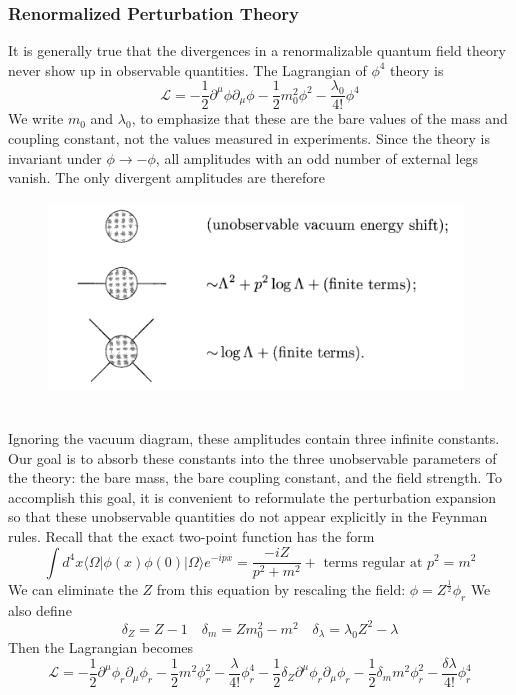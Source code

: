 \documentclass{article}
\begin{document}
\subsubsection{Renormalized Perturbation Theory}
It is generally true that the divergences in a renormalizable quantum field theory never show up in observable quantities. 
The Lagrangian of $\phi^4$ theory is 
\[\mathcal{L} = -\frac{1}{2} \partial^{\mu} \phi \partial_{\mu} \phi -\frac{1}{2}m_0^2 \phi^2 - \frac{\lambda_0}{4!}\phi^4\]
We write $m_0$ and $\lambda_0$, to emphasize that these are the bare values of the mass and coupling constant, not the values measured in experiments.
Since the theory is invariant under $\phi \to -\phi$, all amplitudes with an odd number of external legs vanish. The only divergent amplitudes are therefore
\begin{figure}[!h]
\centering
\includegraphics[height=5cm ,width=11cm]{./pic/RG1.png}
\caption*{}
\end{figure}\\
Ignoring the vacuum diagram, these amplitudes contain three infinite constants. Our goal is to absorb these constants into the three unobservable parameters of the theory: the bare mass, the bare coupling constant, and the field strength. To accomplish this goal, it is convenient to reformulate the perturbation expansion so that these unobservable quantities do not appear
explicitly in the Feynman rules. Recall that the exact two-point function has the form
\[\int d^4x \langle \Omega | \phi(x) \phi(0) | \Omega \rangle e^{-ipx} = \frac{-iZ}{p^2+m^2} + \mbox{ terms regular at } p^2 = m^2\]
We can eliminate the $Z$ from this equation by rescaling the field:
$\phi = Z^{\frac{1}{2}} \phi_r$
We also define
\[\delta_Z = Z -1 \quad \delta_m = Zm_0^2 - m^2 \quad \delta_{\lambda} = \lambda_0 Z^2 - \lambda\]
Then the Lagrangian becomes
\[\mathcal{L} = -\frac{1}{2} \partial^{\mu} \phi_r \partial_{\mu} \phi_r -\frac{1}{2}m^2 \phi_r^2 - \frac{\lambda}{4!}\phi_r^4 -\frac{1}{2} \delta_Z \partial^{\mu} \phi_r \partial_{\mu} \phi_r -\frac{1}{2}\delta_m m^2 \phi_r^2 - \frac{\delta \lambda}{4!}\phi_r^4\]
\end{document}
